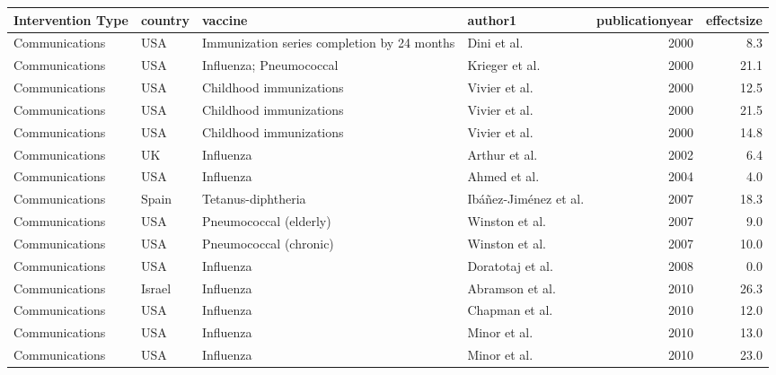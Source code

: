 
\begin{tabular}{llllrr}
\toprule
Intervention Type & country & vaccine & author1 & publicationyear & effectsize\\
\midrule
Communications & USA & Immunization series completion by 24 months & Dini et al. & 2000 & 8.3\\
Communications & USA & Influenza; Pneumococcal & Krieger et al. & 2000 & 21.1\\
Communications & USA & Childhood immunizations & Vivier et al. & 2000 & 12.5\\
Communications & USA & Childhood immunizations & Vivier et al. & 2000 & 21.5\\
Communications & USA & Childhood immunizations & Vivier et al. & 2000 & 14.8\\
\addlinespace
Communications & UK & Influenza & Arthur et al. & 2002 & 6.4\\
Communications & USA & Influenza & Ahmed et al. & 2004 & 4.0\\
Communications & Spain & Tetanus-diphtheria & Ibáñez-Jiménez et al. & 2007 & 18.3\\
Communications & USA & Pneumococcal (elderly) & Winston et al. & 2007 & 9.0\\
Communications & USA & Pneumococcal (chronic) & Winston et al. & 2007 & 10.0\\
\addlinespace
Communications & USA & Influenza & Doratotaj et al. & 2008 & 0.0\\
Communications & Israel & Influenza & Abramson et al. & 2010 & 26.3\\
Communications & USA & Influenza & Chapman et al. & 2010 & 12.0\\
Communications & USA & Influenza & Minor et al. & 2010 & 13.0\\
Communications & USA & Influenza & Minor et al. & 2010 & 23.0\\
\bottomrule
\end{tabular}

